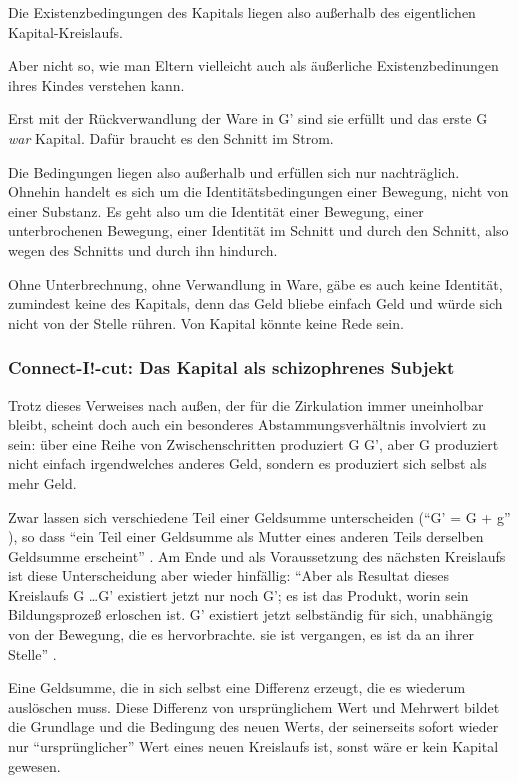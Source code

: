 \documentclass[12pt,
               DIV13,
               paper=a4,
               twoside=false,
               onehalfspacing,
               bibliography=totoc,
               toc=graduated,
               draft,
               ]{scrartcl}
\newcommand{\pc}[2]{\parencite[#1]{#2}}
\begin{document}
Die Existenzbedingungen des Kapitals liegen also außerhalb des
eigentlichen Ka\-pi\-tal-Kreis\-laufs.

Aber nicht so, wie man Eltern vielleicht auch als äußerliche
Existenzbedinungen ihres Kindes verstehen kann.

Erst mit der Rückverwandlung der Ware
in G' sind sie erfüllt und das erste G \emph{war} Kapital. Dafür
braucht es den Schnitt im Strom.

Die Bedingungen liegen also außerhalb und erfüllen sich nur
nachträglich. Ohnehin handelt es sich um die Identitätsbedingungen
einer Bewegung, nicht von einer Substanz. Es geht also um die
Identität einer Bewegung, einer unterbrochenen Bewegung, einer
Identität im Schnitt und durch den Schnitt, also wegen des Schnitts
und durch ihn hindurch.

Ohne Unterbrechnung, ohne Verwandlung in Ware, gäbe es auch keine
Identität, zumindest keine des Kapitals, denn das Geld bliebe einfach
Geld und würde sich nicht von der Stelle rühren. Von Kapital könnte
keine Rede sein.



\subsubsection{Connect-I!-cut: Das Kapital als schizophrenes Subjekt}

Trotz dieses Verweises nach außen, der für die Zirkulation immer
uneinholbar bleibt, scheint doch auch ein besonderes
Abstammungsverhältnis involviert zu sein: über eine Reihe von
Zwischenschritten \glq produziert\grq{} G G', aber G \grq
produziert\grq{} nicht einfach irgendwelches anderes Geld, sondern es
produziert sich selbst als mehr Geld.

Zwar lassen sich verschiedene Teil einer Geldsumme unterscheiden ("`G'
= G + g"' \pc{51}{kap2}), so dass "`ein Teil einer Geldsumme als Mutter
eines anderen Teils derselben Geldsumme erscheint"' \pc{55}{kap2}. Am
Ende und als Voraussetzung des nächsten Kreislaufs ist diese
Unterscheidung aber wieder hinfällig: "`Aber als Resultat dieses
Kreislaufs G \dots G' existiert jetzt nur noch G'; es ist das Produkt,
worin sein Bildungsprozeß erloschen ist. G' existiert jetzt
selbständig für sich, unabhängig von der Bewegung, die es
hervorbrachte. sie ist vergangen, es ist da an ihrer Stelle"'
\pc{49}{kap2}.

Eine Geldsumme, die in sich selbst eine Differenz erzeugt, die es
wiederum auslöschen muss. Diese Differenz von ursprünglichem Wert und
Mehrwert bildet die Grundlage und die Bedingung des neuen Werts, der
seinerseits sofort wieder nur "`ursprünglicher"' Wert eines neuen
Kreislaufs ist, sonst wäre er kein Kapital gewesen.
\end{document}
